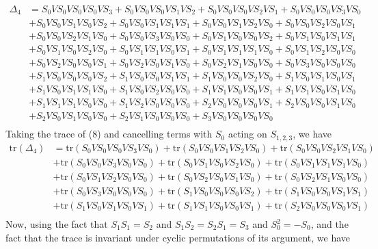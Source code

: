 \documentclass[]{article}
\begin{document}
\begin{enumerate}[1)]
\begin{equation}
\begin{split}
\Delta_4 & =  
S_0VS_0VS_0VS_0VS_3+
S_0VS_0VS_0VS_1VS_2+
S_0VS_0VS_0VS_2VS_1+
S_0VS_0VS_0VS_3VS_0 \\ &+
S_0VS_0VS_1VS_0VS_2+ 
S_0VS_0VS_1VS_1VS_1+
S_0VS_0VS_1VS_2VS_0+
S_0VS_0VS_2VS_0VS_1 \\ &+
S_0VS_0VS_2VS_1VS_0+
S_0VS_0VS_3VS_0VS_0+
S_0VS_1VS_0VS_0VS_2+
S_0VS_1VS_0VS_1VS_1 \\ &+
S_0VS_1VS_0VS_2VS_0+
S_0VS_1VS_1VS_0VS_1+
S_0VS_1VS_1VS_1VS_0+
S_0VS_1VS_2VS_0VS_0 \\ &+
S_0VS_2VS_0VS_0VS_1+
S_0VS_2VS_0VS_1VS_0+
S_0VS_2VS_1VS_0VS_0+
S_0VS_3VS_0VS_0VS_0 \\ &+
S_1VS_0VS_0VS_0VS_2+
S_1VS_0VS_0VS_1VS_1+
S_1VS_0VS_0VS_2VS_0+
S_1VS_0VS_1VS_0VS_1 \\ &+
S_1VS_0VS_1VS_1VS_0+
S_1VS_0VS_2VS_0VS_0+
S_1VS_1VS_0VS_0VS_1+
S_1VS_1VS_0VS_1VS_0 \\ &+
S_1VS_1VS_1VS_0VS_0+
S_1VS_2VS_0VS_0VS_0+
S_2VS_0VS_0VS_0VS_1+
S_2VS_0VS_0VS_1VS_0 \\ &+
S_2VS_0VS_1VS_0VS_0+
S_2VS_1VS_0VS_0VS_0+
S_3VS_0VS_0VS_0VS_0
\\
\end{split}
\end{equation}
Taking the trace of (8) and cancelling terms with $S_0$ acting on $S_{1,2,3}$, we have
\begin{equation}
\begin{split}
\text{tr}(\Delta_4) & =  
\text{tr}(S_0VS_0VS_0VS_3VS_0)+
\text{tr}(S_0VS_0VS_1VS_2VS_0)+
\text{tr}(S_0VS_0VS_2VS_1VS_0) \\ &+
\text{tr}(S_0VS_0VS_3VS_0VS_0)+
\text{tr}(S_0VS_1VS_0VS_2VS_0)+
\text{tr}(S_0VS_1VS_1VS_1VS_0) \\ &+
\text{tr}(S_0VS_1VS_2VS_0VS_0)+
\text{tr}(S_0VS_2VS_0VS_1VS_0)+
\text{tr}(S_0VS_2VS_1VS_0VS_0) \\ &+
\text{tr}(S_0VS_3VS_0VS_0VS_0)+
\text{tr}(S_1VS_0VS_0VS_0VS_2)+
\text{tr}(S_1VS_0VS_0VS_1VS_1) \\ &+
\text{tr}(S_1VS_0VS_1VS_0VS_1)+
\text{tr}(S_1VS_1VS_0VS_0VS_1)+
\text{tr}(S_2VS_0VS_0VS_0VS_1)\\
\end{split}
\end{equation}
Now, using the fact that $S_1S_1 = S_2$ and $S_1S_2=S_2S_1=S_3$ and $S_0^2=-S_0$, and the fact that the trace is invariant under cyclic permutations of its argument, we have
\begin{equation}

\end{equation}
\end{enumerate}
\end{document}
